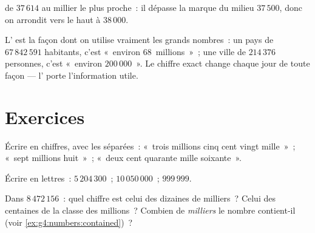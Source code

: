 \begin{omfigure}

{\small {} de $37\,614$ au millier le plus proche~: il dépasse
la marque du milieu $37\,500$, donc on arrondit vers le haut à
$38\,000$.}
\end{omfigure}

\begin{example}\label{ex:g4:numbers:world}
L' est la façon dont on utilise vraiment les grands
nombres~: un pays de $67\,842\,591$ habitants, c'est «~environ
$68$~millions~»~; une ville de $214\,376$ personnes, c'est «~environ
$200\,000$~». Le chiffre exact change chaque jour de toute façon ---
l' porte l'information utile.
\end{example}

\section{Exercices}

\begin{exercise}[$\star$]\label{exo:g4:numbers:1}
Écrire en chiffres, avec les  séparées~: «~trois millions cinq
cent vingt mille~»~; «~sept millions huit~»~; «~deux cent quarante
mille soixante~».
\end{exercise}

\begin{exercise}[$\star$]\label{exo:g4:numbers:2}
Écrire en lettres~: $5\,204\,300$~; \quad $10\,050\,000$~; \quad
$999\,999$.
\end{exercise}

\begin{exercise}[$\star$]\label{exo:g4:numbers:3}
Dans $8\,472\,156$~: quel chiffre est celui des dizaines de
milliers~? Celui des centaines de la classe des millions~? Combien
de \emph{milliers} le nombre contient-il (voir
\cref{ex:g4:numbers:contained})~?
\end{exercise}

